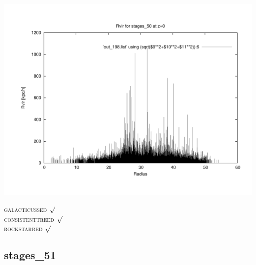 \includegraphics[scale=0.3]{stages_50/plot_rvir_z0.pdf}

\textsc{galacticussed} $\surd$ \\
\textsc{consistenttreed} $\surd$ \\ 
\textsc{rockstarred} $\surd$



% 
%
%
%
%
%
%
%


\newpage
\subsection{stages\_51}

